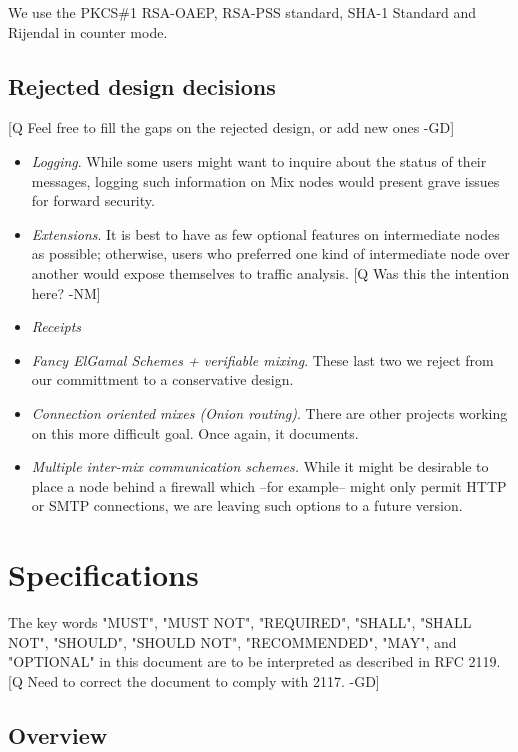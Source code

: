\documentclass{article}
\begin{document}
We use the PKCS\#1 RSA-OAEP, RSA-PSS standard, SHA-1 Standard and
Rijendal in counter mode. 

\subsection{Rejected design decisions}

[Q Feel free to fill the gaps on the rejected design, or add new
ones -GD]

\begin{itemize}
\item \emph{Logging}.  While some users might want to inquire about
   the status of their messages, logging such information on Mix nodes
   would present grave issues for forward security.
\item \emph{Extensions}.  It is best to have as few optional features
   on intermediate nodes as possible; otherwise, users who preferred
   one kind of intermediate node over another would expose themselves
   to traffic analysis. [Q Was this the intention here? -NM]
\item \emph{Receipts}
\item \emph{Fancy ElGamal Schemes + verifiable mixing}.  These last
   two we reject from our committment to a conservative design.
\item \emph{Connection oriented mixes (Onion routing)}.  There are
   other projects working on this more difficult goal.  Once again, it 
   documents.
\item \emph{Multiple inter-mix communication schemes.}  While it might
   be desirable to place a node behind a firewall which --for
   example-- might only permit HTTP or SMTP connections, we are
   leaving such options to a future version.
\end{itemize}

\section{Specifications}

The key words "MUST", "MUST NOT", "REQUIRED", "SHALL", "SHALL
NOT", "SHOULD", "SHOULD NOT", "RECOMMENDED",  "MAY", and
"OPTIONAL" in this document are to be interpreted as described in
RFC 2119. [Q Need to correct the document to comply with 2117. -GD]

\subsection{Overview}
\end{document}

